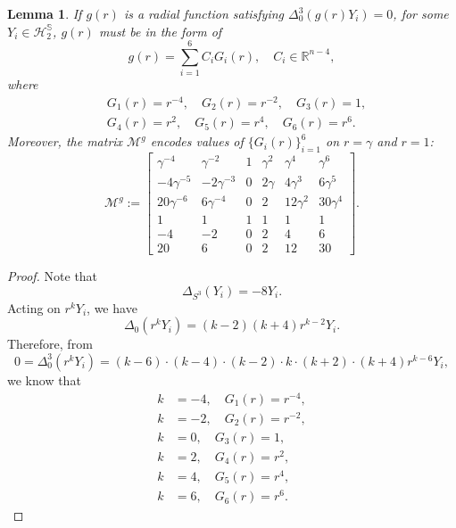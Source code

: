 \documentclass[11pt,letterpaper]{amsart}
\newcommand{\mM}{\mathcal{M}}
\newcommand{\bR}{\mathbb{R}}
\newcommand{\bS}{\mathbb{S}}
\newtheorem{lemma}[theorem]{Lemma}
\theoremstyle{definition}
\theoremstyle{remark}
\numberwithin{equation}{section}
\begin{document}
\begin{lemma}\label{g}
    If $g(r)$ is a radial function satisfying $\Delta_0^3 (g(r)Y_i)=0$, for some $Y_i\in \mathcal{H}^{\bS}_{2}$, $g(r)$ must be in the form of
    \begin{equation}
        g(r)=\sum_{i=1}^{6}C_i G_i(r), \quad C_i\in \bR^{n-4},
    \end{equation}
where
\begin{equation*}
    \begin{split}
        &G_1(r)=r^{-4}, \quad G_2(r)=r^{-2}, \quad G_3(r)=1,\\
        &G_4(r)=r^2, \quad G_5(r)=r^4, \quad G_6(r)=r^6.
    \end{split}
\end{equation*}
Moreover, the matrix $\mM^{g}$ encodes values of $\{G_i(r)\}_{i=1}^{6}$ on $r=\gamma$ and $r=1$:
\begin{equation}\label{Mg}
\mM^{g}:=\begin{bmatrix}
\gamma^{-4} & \gamma^{-2} &  1 & \gamma^2 & \gamma^4& \gamma^6\\
-4\gamma^{-5} & -2\gamma^{-3} & 0 & 2 \gamma & 4\gamma^3& 6\gamma^5\\
20\gamma^{-6} & 6\gamma^{-4} & 0 & 2 & 12 \gamma^2& 30\gamma^4\\
1 & 1 & 1 & 1 & 1& 1\\
-4 & -2 & 0 & 2 & 4& 6\\
20 & 6 & 0 & 2 & 12& 30
\end{bmatrix}.
\end{equation}

\end{lemma}
\begin{proof}
    Note that
    \begin{equation*}
        \Delta_{S^3}(Y_i)=-8Y_i.
    \end{equation*}
Acting on $r^kY_i$, we have
\begin{equation*}
    \Delta_0 (r^kY_i)=(k-2)(k+4)r^{k-2}Y_i.
\end{equation*}
Therefore, from
\begin{equation*}
    0=\Delta^3_0 (r^kY_i)=(k-6)\cdot (k-4)\cdot (k-2)\cdot k\cdot(k+2)\cdot(k+4)r^{k-6}Y_i,
\end{equation*}
we know that
\begin{equation*}
    \begin{split}
        k&=-4, \quad G_1(r)=r^{-4},\\
        k&=-2, \quad G_2(r)=r^{-2},\\
        k&=0, \quad G_3(r)=1,\\
        k&=2, \quad G_4(r)=r^2,\\
        k&=4, \quad G_5(r)=r^4,\\
        k&=6, \quad G_6(r)=r^6.
    \end{split}
\end{equation*}
\end{proof}
\end{document}
